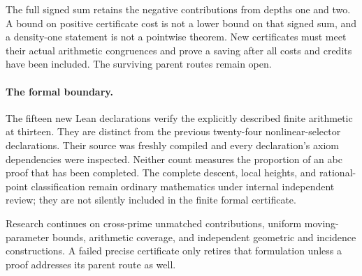 The full signed sum retains the negative contributions from depths
one and two. A bound on positive certificate cost is not a lower
bound on that signed sum, and a density-one statement is not a
pointwise theorem. New certificates must meet their actual arithmetic
congruences and prove a saving after all costs and credits have been
included. The surviving parent routes remain open.

\paragraph{The formal boundary.}
The fifteen new Lean declarations verify the explicitly described
finite arithmetic at thirteen. They are distinct from the previous
twenty-four nonlinear-selector declarations. Their source was freshly
compiled and every declaration's axiom dependencies were inspected.
Neither count measures the proportion of an abc proof that has been
completed. The complete descent, local heights, and rational-point
classification remain ordinary mathematics under internal independent
review; they are not silently included in the finite formal certificate.

Research continues on cross-prime unmatched contributions, uniform
moving-parameter bounds, arithmetic coverage, and independent geometric
and incidence constructions. A failed precise certificate only retires
that formulation unless a proof addresses its parent route as well.

